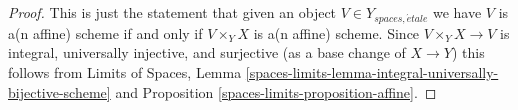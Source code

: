 \documentclass[10pt,a4paper]{amsart}
\theoremstyle{plain}
\theoremstyle{definition}
\theoremstyle{remark}
\numberwithin{equation}{subsection}
\def\etale{{\acute{e}tale}}
\begin{document}
\begin{proof}
This is just the statement that given an object
$V \in Y_{spaces, \etale}$ we have $V$ is a(n affine) scheme if and
only if $V \times_Y X$ is a(n affine) scheme. Since $V \times_Y X \to V$
is integral, universally injective, and surjective (as a base
change of $X \to Y$) this
follows from Limits of Spaces, Lemma
\ref{spaces-limits-lemma-integral-universally-bijective-scheme} and
Proposition \ref{spaces-limits-proposition-affine}.
\end{proof}
\end{document}
